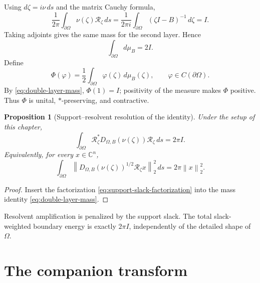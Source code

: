 \documentclass[11pt,oneside,openany]{book}
\newtheorem{proposition}[theorem]{Proposition}
\theoremstyle{definition}
\theoremstyle{remark}
\newcommand{\C}{\mathbb C}
\newcommand{\norm}[1]{\left\lVert #1\right\rVert}
\begin{document}
Using \(d\zeta=i\nu\,ds\) and the matrix Cauchy formula,
\[
  \frac{1}{2\pi}\int_{\partial\Omega}
  \nu(\zeta)\mathcal R_\zeta\,ds
  =
  \frac{1}{2\pi i}\int_{\partial\Omega}
  (\zeta I-B)^{-1}\,d\zeta
  =I.
\]
Taking adjoints gives the same mass for the second layer.  Hence
\begin{equation}
  \int_{\partial\Omega}d\mu_B=2I.
  \label{eq:double-layer-mass}
\end{equation}
Define
\begin{equation}
  \Phi(\varphi)=\frac12
  \int_{\partial\Omega}\varphi(\zeta)\,d\mu_B(\zeta),
  \qquad \varphi\in C(\partial\Omega).
  \label{eq:Phi}
\end{equation}
By \eqref{eq:double-layer-mass}, \(\Phi(1)=I\); positivity of the
measure makes \(\Phi\) positive.  Thus \(\Phi\) is unital,
\(*\)-preserving, and contractive.

\begin{proposition}[Support--resolvent resolution of the identity]
\label{prop:support-resolvent-resolution}
Under the setup of this chapter,
\begin{equation}
  \int_{\partial\Omega}
  \mathcal R_\zeta^*
  D_{\Omega,B}(\nu(\zeta))
  \mathcal R_\zeta\,ds
  =2\pi I.
  \label{eq:support-resolvent-resolution}
\end{equation}
Equivalently, for every \(x\in\C^n\),
\begin{equation}
  \int_{\partial\Omega}
  \norm{
    D_{\Omega,B}(\nu(\zeta))^{1/2}
    \mathcal R_\zeta x
  }_2^2\,ds
  =2\pi\norm{x}_2^2.
  \label{eq:support-resolvent-vector}
\end{equation}
\end{proposition}

\begin{proof}
Insert the factorization
\eqref{eq:support-slack-factorization} into the mass identity
\eqref{eq:double-layer-mass}.
\end{proof}

\begin{intuitionbox}
Resolvent amplification is penalized by the support slack.  The total
slack-weighted boundary energy is exactly \(2\pi I\), independently of
the detailed shape of \(\Omega\).
\end{intuitionbox}

\section{The companion transform}
\end{document}
